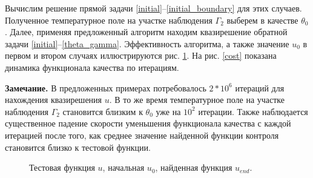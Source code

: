 \documentclass[10pt]{article}
\begin{document}
    Вычислим решение прямой задачи \eqref{initial}--\eqref{initial_boundary} для этих случаев. Полученное температурное поле на участке наблюдения $\Gamma_2$ выберем в качестве $\theta_0$. Далее, применяя предложенный алгоритм находим квазирешение обратной задачи \eqref{initial}--\eqref{theta_gamma}. Эффективность алгоритма, а также значение $u_0$ в первом и втором случаях иллюстрируются рис. \ref{control}. На рис. \ref{cost} показана динамика функционала качества по итерациям.

    {\bf Замечание.} В предложенных примерах потребовалось $2*10^6$ итераций для нахождения квазирешения $u$. В то же время температурное поле на участке наблюдения $\Gamma_2$ становится близким к $\theta_0$ уже на $10^2$ итерации. Также наблюдается существенное падение скорости уменьшения функционала качества с каждой итерацией после того, как среднее значение найденной функции контроля становится близко к тестовой функции.
    \begin{figure}[H]
        \centering
        \caption{Тестовая функция $u$, начальная $u_0$, найденная функция $u_{end}.$}
        \label{control}
    \end{figure}
\end{document}
